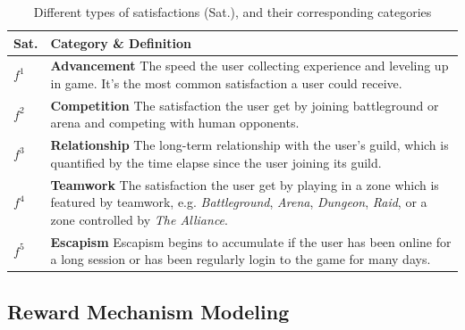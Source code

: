 \documentclass{sigchi}
\begin{document}
\begin{table}
\caption{Different types of satisfactions (Sat.), and their corresponding categories}
\begin{tabularx}{\textwidth}{lX}
    Sat. & \textbf{Category} \& Definition \\
    \midrule
    $f^1$ & \textbf{Advancement} The speed the user collecting experience and leveling up in game. It's the most common satisfaction a user could receive. \\
    $f^2$ & \textbf{Competition} The satisfaction the user get by joining battleground or arena and competing with human opponents. \\
    $f^3$ & \textbf{Relationship} The long-term relationship with the user's guild, which is quantified by the time elapse since the user joining its guild. \\
    $f^4$ & \textbf{Teamwork} The satisfaction the user get by playing in a zone which is featured by teamwork, e.g. \textit{Battleground}, \textit{Arena}, \textit{Dungeon}, \textit{Raid}, or a zone controlled by \textit{The Alliance}. \\
    $f^5$ & \textbf{Escapism} Escapism begins to accumulate if the user has been online for a long session or has been regularly login to the game for many days.
    \label{tbl:satisfactions}
\end{tabularx}
\end{table}

\subsection{Reward Mechanism Modeling}
\end{document}
